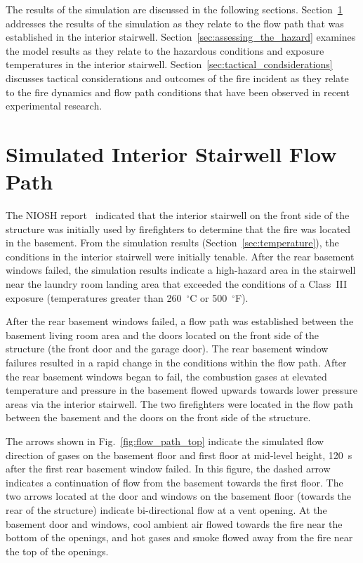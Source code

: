 \documentclass[12pt,oneside]{book}
\begin{document}
The results of the simulation are discussed in the following sections. Section~\ref{sec:simulated_flow_path} addresses the results of the simulation as they relate to the flow path that was established in the interior stairwell. Section~\ref{sec:assessing_the_hazard} examines the model results as they relate to the hazardous conditions and exposure temperatures in the interior stairwell. Section~\ref{sec:tactical_condsiderations} discusses tactical considerations and outcomes of the fire incident as they relate to the fire dynamics and flow path conditions that have been observed in recent experimental research.

\section{Simulated Interior Stairwell Flow Path}
\label{sec:simulated_flow_path}

The NIOSH report~\cite{NIOSH:Bowyer2} indicated that the interior stairwell on the front side of the structure was initially used by firefighters to determine that the fire was located in the basement. From the simulation results (Section~\ref{sec:temperature}), the conditions in the interior stairwell were initially tenable. After the rear basement windows failed, the simulation results indicate a high-hazard area in the stairwell near the laundry room landing area that exceeded the conditions of a Class~III exposure (temperatures greater than 260~$^{\circ}$C or 500~$^{\circ}$F).

After the rear basement windows failed, a flow path was established between the basement living room area and the doors located on the front side of the structure (the front door and the garage door). The rear basement window failures resulted in a rapid change in the conditions within the flow path. After the rear basement windows began to fail, the combustion gases at elevated temperature and pressure in the basement flowed upwards towards lower pressure areas via the interior stairwell. The two firefighters were located in the flow path between the basement and the doors on the front side of the structure.

The arrows shown in Fig.~\ref{fig:flow_path_top} indicate the simulated flow direction of gases on the basement floor and first floor at mid-level height, 120~s after the first rear basement window failed. In this figure, the dashed arrow indicates a continuation of flow from the basement towards the first floor. The two arrows located at the door and windows on the basement floor (towards the rear of the structure) indicate bi-directional flow at a vent opening. At the basement door and windows, cool ambient air flowed towards the fire near the bottom of the openings, and hot gases and smoke flowed away from the fire near the top of the openings.
\end{document}
